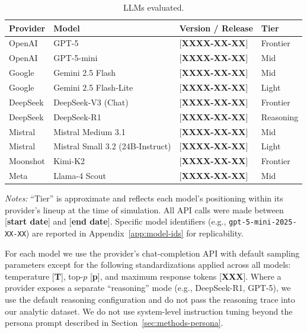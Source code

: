\documentclass[12pt]{article}
\begin{document}
\begin{table}[h]
    \centering
    \caption{LLMs evaluated.}
    \label{tab:models}
    \begin{threeparttable}
    \begin{tabular}{llll}
        \toprule
        Provider & Model & Version / Release & Tier \\
        \midrule
        OpenAI    & GPT-5                     & [\textbf{XXXX-XX-XX}] & Frontier \\
        OpenAI    & GPT-5-mini                & [\textbf{XXXX-XX-XX}] & Mid \\
        Google    & Gemini 2.5 Flash          & [\textbf{XXXX-XX-XX}] & Mid \\
        Google    & Gemini 2.5 Flash-Lite     & [\textbf{XXXX-XX-XX}] & Light \\
        DeepSeek  & DeepSeek-V3 (Chat)        & [\textbf{XXXX-XX-XX}] & Frontier \\
        DeepSeek  & DeepSeek-R1               & [\textbf{XXXX-XX-XX}] & Reasoning \\
        Mistral   & Mistral Medium 3.1        & [\textbf{XXXX-XX-XX}] & Mid \\
        Mistral   & Mistral Small 3.2 (24B-Instruct) & [\textbf{XXXX-XX-XX}] & Light \\
        Moonshot  & Kimi-K2                   & [\textbf{XXXX-XX-XX}] & Frontier \\
        Meta      & Llama-4 Scout             & [\textbf{XXXX-XX-XX}] & Mid \\
        \bottomrule
    \end{tabular}
    \begin{tablenotes}\footnotesize
    \item \textit{Notes:} ``Tier'' is approximate and reflects each model's
    positioning within its provider's lineup at the time of simulation.
    All API calls were made between [\textbf{start date}] and
    [\textbf{end date}]. Specific model identifiers (e.g.,
    \texttt{gpt-5-mini-2025-XX-XX}) are reported in
    Appendix~\ref{app:model-ids} for replicability.
    \end{tablenotes}
    \end{threeparttable}
\end{table}

For each model we use the provider's chat-completion API with default
sampling parameters except for the following standardizations applied
across all models: temperature [\textbf{T}], top-$p$ [\textbf{p}], and
maximum response tokens [\textbf{XXX}]. Where a provider exposes a
separate ``reasoning'' mode (e.g., DeepSeek-R1, GPT-5), we use the default
reasoning configuration and do not pass the reasoning trace into our
analytic dataset. We do not use system-level instruction tuning beyond the
persona prompt described in Section~\ref{sec:methods-persona}.
\end{document}
